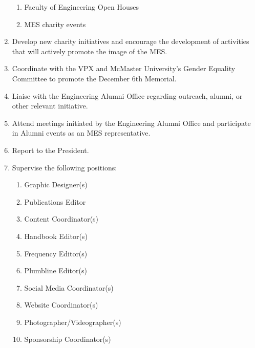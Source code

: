 \begin{enumerate}
  \begin{enumerate}
   \item
    Faculty of Engineering Open Houses
   \item
    MES charity events
  \end{enumerate}
 \item
  Develop new charity initiatives and encourage the development of activities that will actively promote the image of the MES.
 \item
  Coordinate with the VPX and McMaster University's Gender Equality Committee to promote the December 6th Memorial.
 \item
  Liaise with the Engineering Alumni Office regarding outreach, alumni, or other relevant initiative.
 \item
  Attend meetings initiated by the Engineering Alumni Office and participate in Alumni events as an MES representative.
 \item
  Report to the President.
 \item
  Supervise the following positions:

  \begin{enumerate}
   \item
    Graphic Designer(s)
   \item
    Publications Editor
   \item
    Content Coordinator(s)
   \item
    Handbook Editor(s)
   \item
    Frequency Editor(s)
   \item
    Plumbline Editor(s)
   \item
    Social Media Coordinator(s)
   \item
    Website Coordinator(s)
   \item
    Photographer/Videographer(s)
   \item
    Sponsorship Coordinator(s)
  \end{enumerate}

\end{enumerate}